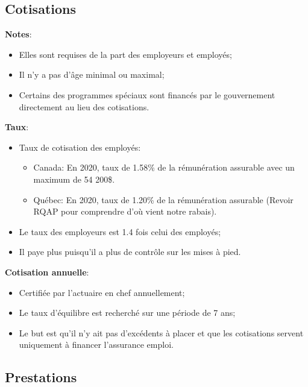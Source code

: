 \documentclass[10pt, french]{article}
\begin{document}
\begin{multicols*}{3}
\columnbreak
\subsection{Cotisations}
\textbf{Notes}:
\begin{itemize}[leftmargin = *]
	\item	Elles sont requises de la part des employeurs et employés;
	\item	Il n'y a pas d'âge minimal ou maximal;
	\item	Certains des programmes spéciaux sont financés par le gouvernement directement au lieu des cotisations.
\end{itemize}

\textbf{Taux}:
\begin{itemize}[leftmargin = *]
	\item	Taux de cotisation des employés:
		\begin{itemize}[leftmargin = *]
		\item	\textcolor{bulgarianrose}{Canada}:  En 2020, taux de 1.58\% de la rémunération assurable avec un maximum de 54 200\$.
		\item	\textcolor{blue(pigment)}{Québec}:  En 2020, taux de 1.20\% de la rémunération assurable (Revoir RQAP pour comprendre d'où vient notre rabais).
		\end{itemize}
	\item	Le taux des employeurs est 1.4 fois celui des employés;
	\item	Il paye plus puisqu'il a plus de contrôle sur les mises à pied.
\end{itemize}

\textbf{Cotisation annuelle}:
\begin{itemize}[leftmargin = *]
	\item	Certifiée par l'actuaire en chef annuellement;
	\item	Le taux d'équilibre est recherché sur une période de 7 ans;
	\item	Le but est qu'il n'y ait pas d'excédents à placer et que les cotisations servent uniquement à financer l'assurance emploi.
\end{itemize}


\columnbreak
\subsection{Prestations}

\end{multicols*}
\end{document}
